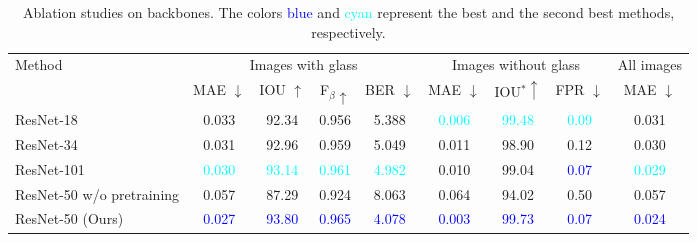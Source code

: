 \begin{table*}[ht]
\renewcommand\arraystretch{1.5}
\setlength\tabcolsep{5pt}
\centering
\caption{Ablation studies on backbones. The colors \textcolor{blue}{blue} and \textcolor{cyan}{cyan} represent the best and the second best methods, respectively.} 
\label{tab:ab_backbone}
\begin{tabular}{lcccccccc} 
\toprule
\multirow{2}{*}{Method} & \multicolumn{4}{c}{Images with glass} & \multicolumn{3}{c}{Images without glass} & All images        \\ 
\cmidrule[0.25pt](lr){2-5} \cmidrule[0.25pt](lr){6-8} \cmidrule[0.25pt](lr){9-9} 
& MAE $\downarrow$                      & IOU $\uparrow$                        & F$_\beta\uparrow$                     & BER $\downarrow$                      & MAE $\downarrow$                      & IOU$^\ast\uparrow$                    & FPR $\downarrow$                     & MAE $\downarrow$  \\ 
\midrule
ResNet-18  & 0.033 & 92.34 & 0.956 & 5.388 & \textcolor{cyan}{0.006} & \textcolor{cyan}{99.48} & \textcolor{cyan}{0.09} & 0.031\\
ResNet-34 & 0.031 & 92.96 & 0.959 & 5.049 & 0.011 & 98.90 & 0.12 & 0.030\\
ResNet-101 & \multicolumn{1}{c}{\textcolor{cyan}{0.030}} & \multicolumn{1}{c}{\textcolor{cyan}{93.14}} & \multicolumn{1}{c}{\textcolor{cyan}{0.961}} & \textcolor{cyan}{4.982} & \multicolumn{1}{c}{0.010} & \multicolumn{1}{c}{99.04} & \textcolor{blue}{0.07} & \textcolor{cyan}{0.029}\\
ResNet-50 w/o pretraining  & \multicolumn{1}{c}{0.057} & \multicolumn{1}{c}{87.29} & \multicolumn{1}{c}{0.924} & 8.063 & \multicolumn{1}{c}{0.064} & \multicolumn{1}{c}{94.02} & 0.50 & 0.057\\ \hline
ResNet-50 (Ours) & \multicolumn{1}{c}{\textcolor{blue}{0.027}} & \multicolumn{1}{c}{\textcolor{blue}{93.80}} & \multicolumn{1}{c}{\textcolor{blue}{0.965}} & \textcolor{blue}{4.078} & \multicolumn{1}{c}{\textcolor{blue}{0.003}} & \multicolumn{1}{c}{\textcolor{blue}{99.73}} & \textcolor{blue}{0.07} &\textcolor{blue}{0.024}\\
\bottomrule
\end{tabular}
\end{table*}

